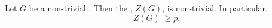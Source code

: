 \begin{lemma} \label{lemma:center_of_a_finite_p_group_is_nontrivial}
Let $G$ be a non-trivial . Then the , $Z(G)$, is non-trivial. In particular,
$$|Z(G)| \geq p.$$
\end{lemma}